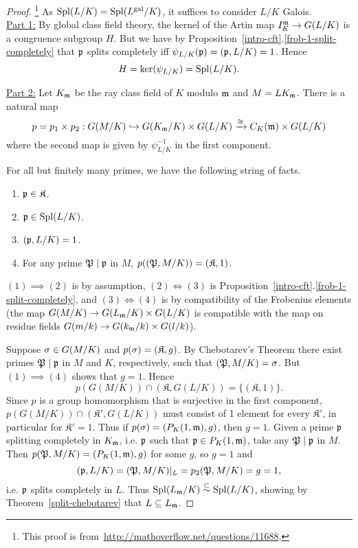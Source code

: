 \begin{proof}\footnote{This proof is from~\url{http://mathoverflow.net/questions/11688}.}
As $\operatorname{Spl}(L/K)=\operatorname{Spl}(L^{\text{gal}}/K)$, it suffices to consider $L/K$ Galois.\\

\noindent\underline{Part 1:} By global class field theory, the kernel of the Artin map $I_K^{\mathfrak{m}}\to G(L/K)$ is a congruence subgroup $H$. But we have by Proposition~\ref{intro-cft}.\ref{frob-1-split-completely} that $\mathfrak{p}$ splits completely iff $\psi_{L/K}(\mathfrak{p})=(\mathfrak{p},L/K)=1$. Hence
\[
H=\ker(\psi_{L/K})=\operatorname{Spl}(L/K).
\]

\noindent\underline{Part 2:} Let $K_{\mathfrak{m}}$ be the ray class field of $K$ modulo $\mathfrak{m}$ and $M=LK_{\mathfrak{m}}$.
There is a natural map
\[
p=p_1\times p_2:G(M/K)\hookrightarrow G(K_{\mathfrak{m}}/K)\times G(L/K) \xrightarrow{\cong} C_{K}(\mathfrak{m})\times G(L/K)
\]
where the second map is given by $\psi_{L/K}^{-1}$ in the first component. 

For all but finitely many primes, we have the following string of facts. %
\begin{enumerate}
\item
$\mathfrak{p}\in \mathfrak K$.
\item
$\mathfrak{p}\in \operatorname{Spl}(L/K)$.
\item
$(\mathfrak{p},L/K)=1$.
\item
For any prime $\mathfrak{P}\mid \mathfrak{p}$ in $M$, 
$p((\mathfrak{P},M/K))=(\mathfrak K,1)$.
\end{enumerate}
$(1)\implies(2)$ is by assumption, $(2)\iff (3)$ is Proposition~\ref{intro-cft}.\ref{frob-1-split-completely}, and $(3)\iff (4)$ is by compatibility of the Frobenius elements (the map $G(M/K)\to G(L_{\mathfrak{m}}/K)\times G(L/K)$ is compatible with the map on residue fields $G(m/k)\to G(k_{\mathfrak{m}}/k)\times G(l/k)$).

Suppose $\sigma\in G(M/K)$ and $p(\sigma)=(\mathfrak K, g)$. By Chebotarev's Theorem there exist primes $\mathfrak{P}\mid \mathfrak{p}$ in $M$ and $K$, respectively, such that $(\mathfrak{P},M/K)=\sigma$. But $(1)\implies (4)$ shows that $g=1$. Hence
\[
p(G(M/K))\cap (\mathfrak K,G(L/K))=\{(\mathfrak K,1)\}.
\]
Since $p$ is a group homomorphism that is surjective in the first component, $p(G(M/K))\cap (\mathfrak K',G(L/K))$ must consist of 1 element for every $\mathfrak K'$, in particular for $\mathfrak K'=1$. Thus if $p(\sigma)=(P_K(1,\mathfrak{m}),g)$, then $g=1$. Given a prime $\mathfrak{p}$ splitting completely in $K_{\mathfrak{m}}$, i.e. $\mathfrak{p}$ such that $\mathfrak{p} \in P_K(1,\mathfrak{m})$, take any $\mathfrak{P}\mid \mathfrak{p}$ in $M$. Then $p(\mathfrak{P},M/K)=(P_K(1,\mathfrak{m}),g)$ for some $g$, so $g=1$ and
\[
(\mathfrak{p},L/K)=(\mathfrak{P},M/K)|_L=p_2(\mathfrak{P},M/K)=g=1,
\]
i.e. $\mathfrak{p}$ splits completely in $L$. Thus $\operatorname{Spl}(L_{\mathfrak{m}}/K)\stackrel{\subset}{\sim}\operatorname{Spl}(L/K)$, showing by Theorem~\ref{split-chebotarev} that
$L\subseteq L_{\mathfrak{m}}$.
\end{proof}
